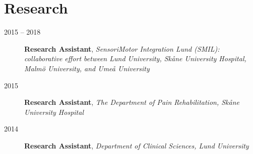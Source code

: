 \documentclass[
  10pt,
  headsepline=true,
  english,
  DIV=12
]{scrartcl}
\renewcommand*{%
  \mkbibnamegiven
}[1]{\ifitemannotation{highlight}{\textbf{#1}}{#1}}
\renewcommand*{%
  \mkbibnamefamily
}[1]{\ifitemannotation{highlight}{\textbf{#1}}{#1}}
\begin{document}






\section{Research}

\begin{description}
  \item[2015 -- 2018] {
        \textbf{Research Assistant}, \emph{SensoriMotor Integration Lund
          (SMIL): collaborative effort between Lund University, Skåne
          University
          Hospital, Malmö University, and Umeå University}
        }
  \item[2015] {
        \textbf{Research Assistant}, \emph{The Department of Pain
          Rehabilitation, Skåne University Hospital}

        }
  \item[2014] {
        \textbf{Research Assistant}, \emph{Department of Clinical Sciences,
          Lund University}

        }
\end{description}
\end{document}
